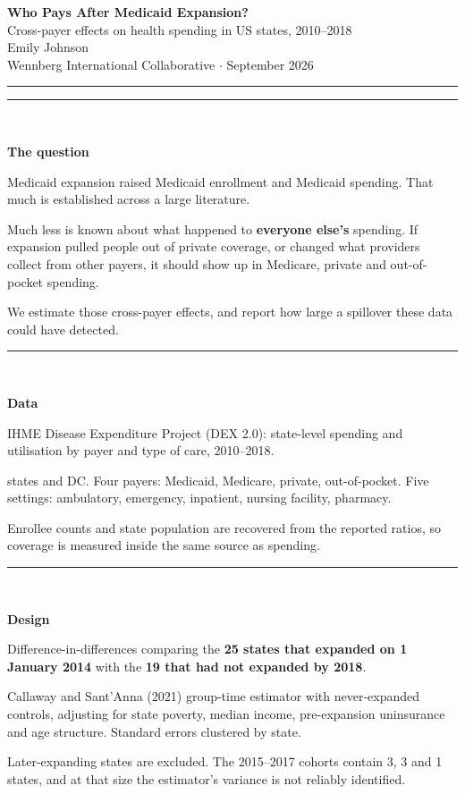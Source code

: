 \documentclass[final]{article}
\newlength{\colw}   \setlength{\colw}{245mm}
\newlength{\colh}   \setlength{\colh}{830mm}
\newcommand{\Body}[1]{{\fontsize{30}{41}\selectfont\RaggedRight #1\par}}
\newcommand{\panel}[2]{%
  \noindent\begin{minipage}[t]{\colw}%
    {\color{LightGray}\rule{\colw}{2.5pt}}\\[5mm]
    {\fontsize{40}{48}\selectfont\bfseries\color{DeepNavy}\RaggedRight #1\par}
    \vspace{6mm}
    #2
  \end{minipage}}
\begin{document}
\begin{center}
  {\fontsize{88}{100}\selectfont\bfseries Who Pays After Medicaid Expansion?}\\[8mm]
  {\fontsize{44}{54}\selectfont\color{WarmGray} Cross-payer effects on health spending in US states, 2010--2018}\\[11mm]
  {\fontsize{38}{46}\selectfont Emily Johnson}\\[5mm]
  {\fontsize{28}{36}\selectfont\color{WarmGray} Wennberg International Collaborative $\cdot$ September 2026}
\end{center}
\vspace{9mm}
{\color{Teal}\rule{\textwidth}{4pt}}
\vspace{11mm}

\noindent
\begin{minipage}[t][\colh][t]{\colw}
\panel{The question}{
  \Body{Medicaid expansion raised Medicaid enrollment and Medicaid spending. That much is
  established across a large literature.}
  \vspace{5mm}
  \Body{Much less is known about what happened to \textbf{everyone else's} spending. If
  expansion pulled people out of private coverage, or changed what providers collect from
  other payers, it should show up in Medicare, private and out-of-pocket spending.}
  \vspace{5mm}
  \Body{We estimate those cross-payer effects, and report how large a spillover these data
  could have detected.}
}
\vfill
\panel{Data}{
  \Body{IHME Disease Expenditure Project (DEX 2.0): state-level spending and utilisation by
  payer and type of care, 2010--2018.}
  \vspace{5mm}
  \Body{50 states and DC. Four payers: Medicaid, Medicare, private, out-of-pocket. Five
  settings: ambulatory, emergency, inpatient, nursing facility, pharmacy.}
  \vspace{5mm}
  \Body{Enrollee counts and state population are recovered from the reported ratios, so
  coverage is measured inside the same source as spending.}
}
\vfill
\panel{Design}{
  \Body{Difference-in-differences comparing the \textbf{25 states that expanded on 1 January
  2014} with the \textbf{19 that had not expanded by 2018}.}
  \vspace{5mm}
  \Body{Callaway and Sant'Anna (2021) group-time estimator with never-expanded controls,
  adjusting for state poverty, median income, pre-expansion uninsurance and age structure.
  Standard errors clustered by state.}
  \vspace{5mm}
  \Body{Later-expanding states are excluded. The 2015--2017 cohorts contain 3, 3 and 1
  states, and at that size the estimator's variance is not reliably identified.}
}

\end{minipage}
\end{document}
